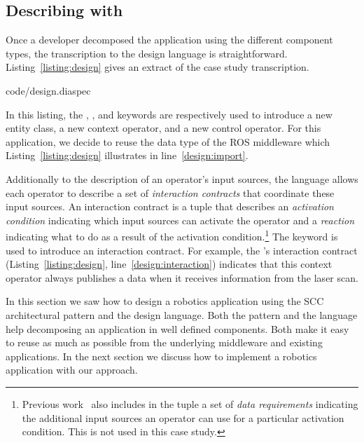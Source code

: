 \subsection{Describing with \diaspec{}}

Once a developer decomposed the application using the different
component types, the transcription to the \diaspec{} design language
is straightforward. Listing~\ref{listing:design} gives an extract of
the case study transcription.

%
{code/design.diaspec}

In this listing, the , , and 
keywords are respectively used to introduce a new entity class, a new
context operator, and a new control operator. For this application, we
decide to reuse the  data type of the ROS middleware which
Listing~\ref{listing:design} illustrates in line~\ref{design:import}.

Additionally to the description of an operator's input sources, the
\diaspec{} language allows each operator to describe a set of
\emph{interaction contracts} that coordinate these input sources. An
interaction contract is a tuple that describes an \emph{activation
  condition} indicating which input sources can activate the operator
and a \emph{reaction} indicating what to do as a result of the
activation condition.\footnote{Previous work~\cite{Cass11a} also
  includes in the tuple a set of \emph{data requirements} indicating
  the additional input sources an operator can use for a particular
  activation condition. This is not used in this case study.} The
 keyword is used to introduce an interaction contract.
For example, the 's interaction contract
(Listing~\ref{listing:design}, line~\ref{design:interaction})
indicates that this context operator always publishes a data when it
receives information from the laser scan.

In this section we saw how to design a robotics application using
the SCC architectural pattern and the \diaspec{} design language. Both
the pattern and the language help decomposing an application in well
defined components. Both make it easy to reuse as much as possible
from the underlying middleware and existing applications. In the next
section we discuss how to implement a robotics application with our
approach.


